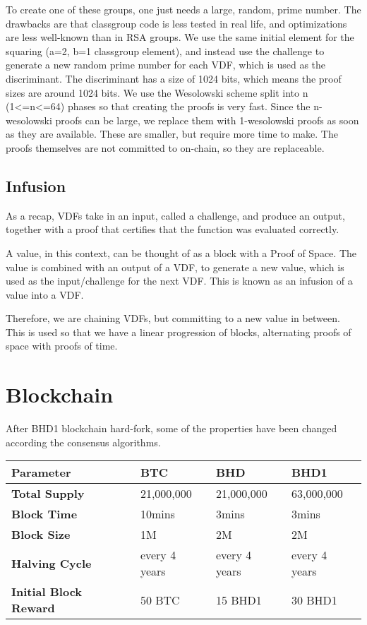 \begin{flushleft}
    To create one of these groups, one just needs a large, random, prime number. The drawbacks are that classgroup code is less tested in real life, and optimizations are less well-known than in RSA groups. We use the same initial element for the squaring (a=2, b=1 classgroup element), and instead use the challenge to generate a new random prime number for each VDF, which is used as the discriminant. The discriminant has a size of 1024 bits, which means the proof sizes are around 1024 bits. We use the Wesolowski scheme split into n (1<=n<=64) phases so that creating the proofs is very fast. Since the n-wesolowski proofs can be large, we replace them with 1-wesolowski proofs as soon as they are available. These are smaller, but require more time to make. The proofs themselves are not committed to on-chain, so they are replaceable.
\end{flushleft}
\subsection{Infusion}
\begin{flushleft}
    As a recap, VDFs take in an input, called a challenge, and produce an output, together with a proof that certifies that the function was evaluated correctly.
\end{flushleft}
\begin{flushleft}
    A value, in this context, can be thought of as a block with a Proof of Space. The value is combined with an output of a VDF, to generate a new value, which is used as the input/challenge for the next VDF. This is known as an infusion of a value into a VDF.
\end{flushleft}
\begin{flushleft}
    Therefore, we are chaining VDFs, but committing to a new value in between. This is used so that we have a linear progression of blocks, alternating proofs of space with proofs of time.
\end{flushleft}
\section{Blockchain}
\begin{flushleft}
    After BHD1 blockchain hard-fork, some of the properties have been changed according the consensus algorithms.
\end{flushleft}
\begin{tabular}{ p{4cm} p{2.5cm} p{2.5cm} p{2.5cm}  }
    \hline
    \rowcolor{lightgray} \textbf{Parameter} & \textbf{BTC} & \textbf{BHD} & \textbf{BHD1} \\[5pt]
    \hline
    \textbf{Total Supply} & 21,000,000 & 21,000,000 & 63,000,000 \\[5pt]
    \rowcolor{lightgray!30} \textbf{Block Time} & 10mins & 3mins & 3mins \\[5pt]
    \textbf{Block Size} & 1M & 2M & 2M \\[5pt]
    \rowcolor{lightgray!30} \textbf{Halving Cycle} & every 4 years & every 4 years & every 4 years \\[5pt]
    \textbf{Initial Block Reward} & 50 BTC & 15 BHD1 & 30 BHD1 \\[5pt]
    \hline
\end{tabular}
